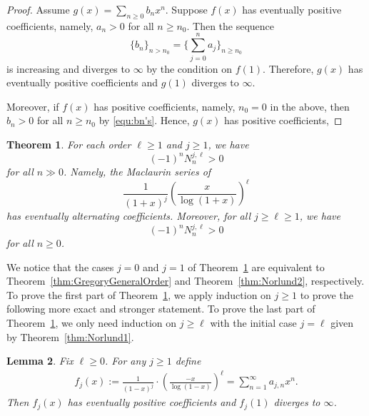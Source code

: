 \documentclass[11pt]{article}
\theoremstyle{plain}
\newtheorem{thm}{Theorem}[section]
\newtheorem{lem}[thm]{Lemma}
\theoremstyle{definition}
\begin{document}
\begin{proof}
Assume $g(x)=\sum_{n\ge 0} b_n x^n$. Suppose $f(x)$ has eventually positive coefficients, namely, $a_n>0$ for all $n\ge n_0$. Then the sequence
\begin{equation}\label{equ:bn's}
 \bigg\{b_n \bigg\}_{n>n_0}=  \bigg\{\sum_{j=0}^n a_j \bigg\}_{n\ge n_0}
\end{equation}
is increasing and diverges to $\infty$ by the condition on $f(1)$.
Therefore, $g(x)$ has eventually positive coefficients and $g(1)$ diverges to $\infty$.

Moreover, if $f(x)$ has positive coefficients, namely, $n_0=0$ in the above, then $b_n>0$ for all $n\ge n_0$ by \eqref{equ:bn's}.
Hence, $g(x)$ has positive coefficients,
\end{proof}

\begin{thm} \label{thm:NorlundType}
For each order $\ell\ge 1$ and $j\ge 1$, we have
\begin{equation*}
(-1)^{n} N_n^{j,\ell}>0
\end{equation*}
for all $n\gg 0$. Namely, the Maclaurin series of
\begin{equation*}
\frac{1}{(1+x)^j} \left(\frac{x}{\log(1+x)}\right)^\ell
\end{equation*}
has eventually alternating coefficients. Moreover, for all $j\ge \ell\ge 1$, we have
\begin{equation*}
(-1)^{n} N_n^{j,\ell}>0
\end{equation*}
for all $n\ge 0$.
\end{thm}

We notice that the cases $j=0$ and $j=1$ of Theorem~\ref{thm:NorlundType} are equivalent to Theorem~\ref{thm:GregoryGeneralOrder} and Theorem~\ref{thm:Norlund2}, respectively. To prove the first part of Theorem~\ref{thm:NorlundType}, we apply induction on $j\ge 1$ to prove the following more exact and stronger statement. To prove the last part of Theorem~\ref{thm:NorlundType},  we only need induction on $j\ge \ell$ with the initial case $j=\ell$ given by  Theorem~\ref{thm:Norlund1}.

\begin{lem} \label{lem:fjInduction}
Fix $\ell\ge 0$. For any $j\ge 1$ define
 \begin{align*}
f_j(x):=\frac{1}{(1-x)^j}\cdot \left(\frac{-x}{\log(1-x)}\right)^\ell =\sum_{n=1}^\infty a_{j,n} x^n.
\end{align*}
Then $f_j(x)$ has eventually positive coefficients and $f_j(1)$ diverges to $\infty$.
\end{lem}
\end{document}
